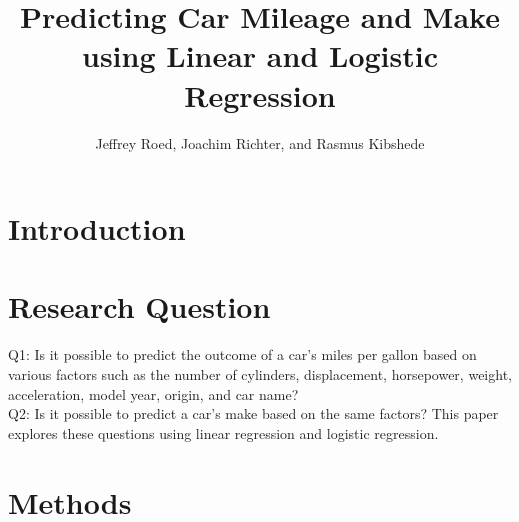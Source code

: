 \documentclass[a4paper, twocolumn]{article}
\author{Jeffrey Roed, Joachim Richter, and Rasmus Kibshede}
\title{Predicting Car Mileage and Make using Linear and Logistic Regression}
\begin{document}


\section{Introduction\label{sec:Introduction}}


\section{Research Question\label{sec:Research Question}}
Q1: Is it possible to predict the outcome of a car's miles per gallon based on various factors such as the number of cylinders, displacement, horsepower, weight, acceleration, model year, origin, and car name?\\
Q2: Is it possible to predict a car's make based on the same factors? This paper explores these questions using linear regression and logistic regression.


\section{Methods\label{sec:Methods}}
\end{document}
